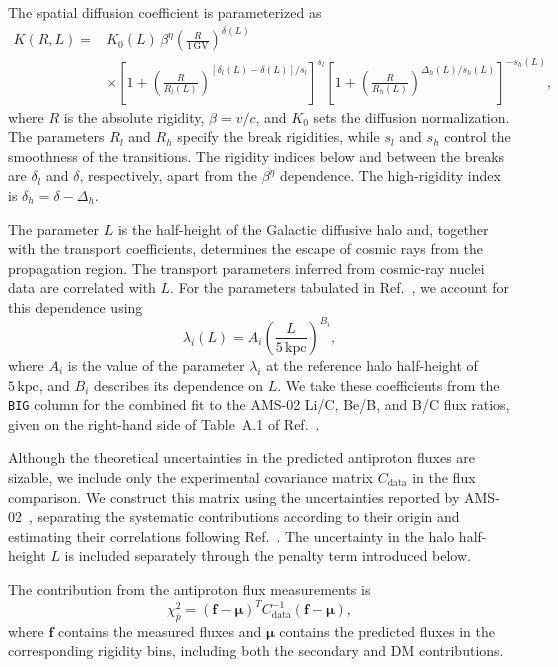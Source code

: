 \documentclass[superscriptaddress,
showpacs,preprintnumbers,nofootinbib,eqsecnum,amsmath,amssymb,aps,11pt, groupedaddress, floatfix]{revtex4-2}
\begin{document}
The spatial diffusion coefficient is parameterized as
\begin{equation}
\begin{aligned}
K(R,L)
={}&
K_0(L)\,\beta^\eta
\left(\frac{R}{1\,\mathrm{GV}}\right)^{\delta(L)}
\\
&\times
\left[
1+
\left(\frac{R}{R_l(L)}\right)^{
[\delta_l(L)-\delta(L)]/s_l}
\right]^{s_l}
\left[
1+
\left(\frac{R}{R_h(L)}\right)^{
\Delta_h(L)/s_h(L)}
\right]^{-s_h(L)} ,
\end{aligned}
\label{eq:transport}
\end{equation}
where $R$ is the absolute rigidity, $\beta=v/c$, and $K_0$
sets the diffusion normalization.
The parameters $R_l$ and $R_h$ specify the break rigidities,
while $s_l$ and $s_h$ control the smoothness of the transitions.
The rigidity indices below and between the breaks are
$\delta_l$ and $\delta$, respectively, apart from the
$\beta^\eta$ dependence.
The high-rigidity index is $\delta_h=\delta-\Delta_h$.

The parameter $L$ is the half-height of the Galactic diffusive
halo and, together with the transport coefficients, determines
the escape of cosmic rays from the propagation region.
The transport parameters inferred from cosmic-ray nuclei data
are correlated with $L$.
For the parameters tabulated in Ref.~\cite{Weinrich:2020ftb},
we account for this dependence using
\begin{equation}
\lambda_i(L)
=
A_i
\left(\frac{L}{5\,\mathrm{kpc}}\right)^{B_i},
\label{eq:scaling_relation_lambda}
\end{equation}
where $A_i$ is the value of the parameter $\lambda_i$ at the
reference halo half-height of $5\,\mathrm{kpc}$, and $B_i$
describes its dependence on $L$.
We take these coefficients from the \texttt{BIG} column for
the combined fit to the AMS-02 Li/C, Be/B, and B/C flux ratios,
given on the right-hand side of Table~A.1 of
Ref.~\cite{Weinrich:2020ftb}.

Although the theoretical uncertainties in the predicted
antiproton fluxes are sizable, we include only the experimental
covariance matrix $C_{\mathrm{data}}$ in the flux comparison.
We construct this matrix using the uncertainties reported by
AMS-02~\cite{AMS:2016oqu}, separating the systematic contributions
according to their origin and estimating their correlations
following Ref.~\cite{Heisig:2020nse}.
The uncertainty in the halo half-height $L$ is included
separately through the penalty term introduced below.

The contribution from the antiproton flux measurements is
\begin{equation}
\chi^2_{\bar p}
=
(\mathbf{f}-\boldsymbol{\mu})^{T}
C_{\mathrm{data}}^{-1}
(\mathbf{f}-\boldsymbol{\mu}),
\label{eq:chi2-antiproton}
\end{equation}
where $\mathbf{f}$ contains the measured fluxes and
$\boldsymbol{\mu}$ contains the predicted fluxes in the
corresponding rigidity bins, including both the secondary
and DM contributions.
\end{document}
